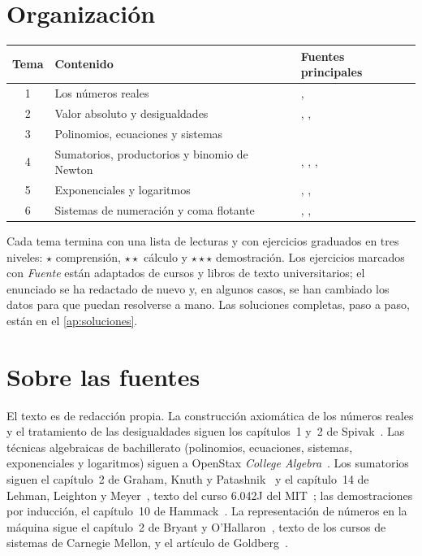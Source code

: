 \documentclass[11pt,a4paper,twoside,openany]{book}
\begin{document}
\section*{Organización}
\begin{center}\small
\begin{tabular}{@{}cll@{}}
\toprule
Tema & Contenido & Fuentes principales \\
\midrule
1 & Los números reales & \cite{spivak}, \cite{openstax} \\
2 & Valor absoluto y desigualdades & \cite{spivak}, \cite{openstax}, \cite{hammack} \\
3 & Polinomios, ecuaciones y sistemas & \cite{openstax} \\
4 & Sumatorios, productorios y binomio de Newton & \cite{gkp}, \cite{mcs}, \cite{openstax}, \cite{hammack} \\
5 & Exponenciales y logaritmos & \cite{openstax}, \cite{ct}, \cite{blanchard} \\
6 & Sistemas de numeración y coma flotante & \cite{csapp}, \cite{goldberg}, \cite{ieee754} \\
\bottomrule
\end{tabular}
\end{center}

Cada tema termina con una lista de lecturas y con ejercicios graduados en tres niveles: $\star$ comprensión, $\star\star$ cálculo y $\star\star\star$ demostración. Los ejercicios marcados con \emph{Fuente} están adaptados de cursos y libros de texto universitarios; el enunciado se ha redactado de nuevo y, en algunos casos, se han cambiado los datos para que puedan resolverse a mano. Las soluciones completas, paso a paso, están en el \cref{ap:soluciones}.

\section*{Sobre las fuentes}
El texto es de redacción propia. La construcción axiomática de los números reales y el tratamiento de las desigualdades siguen los capítulos~1 y~2 de Spivak~\cite{spivak}. Las técnicas algebraicas de bachillerato (polinomios, ecuaciones, sistemas, exponenciales y logaritmos) siguen a OpenStax \emph{College Algebra}~\cite{openstax}. Los sumatorios siguen el capítulo~2 de Graham, Knuth y Patashnik~\cite{gkp} y el capítulo~14 de Lehman, Leighton y Meyer~\cite{mcs}, texto del curso 6.042J del MIT~\cite{mit6042}; las demostraciones por inducción, el capítulo~10 de Hammack~\cite{hammack}. La representación de números en la máquina sigue el capítulo~2 de Bryant y O'Hallaron~\cite{csapp}, texto de los cursos de sistemas de Carnegie Mellon, y el artículo de Goldberg~\cite{goldberg}.
\end{document}
